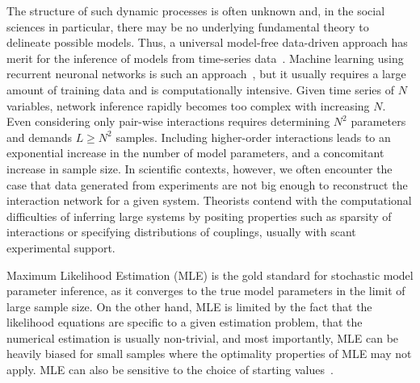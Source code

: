 \documentclass[prx,twocolumn,twoside,showpacs,superscriptaddress]{revtex4-1}
\begin{document}
The structure of such dynamic processes is often unknown and, in the social sciences in particular, there may be no underlying fundamental theory to delineate possible models.
Thus, a universal model-free data-driven approach has merit for the inference of  models from time-series data~\cite{Janes2006}.
Machine learning using recurrent neuronal networks is such an approach~\cite{Connor1994}, but it usually requires a large amount of training data and is computationally intensive.
Given time series of $N$ variables, network inference rapidly becomes too complex with increasing $N.$
Even considering only pair-wise interactions requires determining $N^2$ parameters and demands $L \ge N^2$  samples.
Including higher-order interactions leads to an exponential increase in the number of model parameters, and a concomitant increase in sample size.
In scientific contexts, however, we often encounter the case that data generated from experiments are not big enough to reconstruct the interaction network for a given system.
Theorists contend with the computational difficulties of inferring large systems by positing properties such as sparsity of interactions or specifying distributions of couplings, usually with scant experimental support. 

Maximum Likelihood  Estimation (MLE) is the gold standard for stochastic model parameter inference, as it converges to the true model parameters in the limit of large sample size. On the other hand, MLE is limited by the fact that the likelihood equations are specific to a given estimation problem, that the numerical estimation is usually non-trivial, and most importantly, MLE can be heavily biased for small samples where the optimality properties of MLE may not apply. MLE can also be sensitive to the choice of starting values~\cite{nistwebsite}. %
\end{document}
